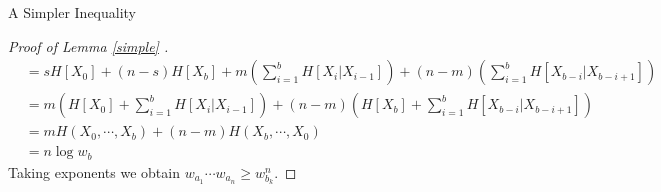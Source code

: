 \documentclass[11pt,a4paper]{article}
\begin{document}
\begin{section}{A Simpler Inequality}
\begin{proof}[Proof of Lemma \ref{simple} ]
\begin{align*}
& = s H[X_0] + (n - s) H[X_b] + m \left ( \sum_{i = 1}^b H[X_i | X_{i - 1} ] \right ) + (n - m) \left ( \sum_{i = 1}^b H[X_{b - i} | X_{b - i + 1} ] \right ) \\
& = m \left ( H[X_0] + \sum_{i = 1}^b H[X_i | X_{i - 1} ] \right ) + (n - m) \left ( H[X_b] + \sum_{i = 1}^b H[X_{b - i} | X_{b - i + 1} ] \right ) \\
& = m H(X_0, \cdots, X_b) + (n - m) H(X_b, \cdots, X_0)\\
& = n \log w_b
\end{align*}
Taking exponents we obtain $ w_{a_1}\cdots w_{a_n} \geq w_{b_k}^n$.
\end{proof}



\end{section}
\end{document}
